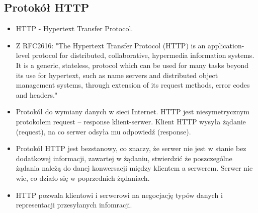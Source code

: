 \documentclass[../main.tex]{subfiles}
\begin{document}
    \subsection{Protokół HTTP}

    \begin{itemize}
        \item HTTP - Hypertext Transfer Protocol.
        \item Z RFC2616: "The Hypertext Transfer Protocol (HTTP) is an application-level protocol for distributed, collaborative, hypermedia information systems. It is a generic, stateless, protocol which can be used for many tasks beyond its use for hypertext, such as name servers and distributed object management systems, through extension of its request methods, error codes and headers."
        \item Protokół do wymiany danych w sieci Internet. HTTP jest niesymetrycznym protokołem request – response klient-serwer. Klient HTTP wysyła żądanie (request), na co serwer odsyła mu odpowiedź (response).
        \item Protokół HTTP jest bezstanowy, co znaczy, że serwer nie jest w stanie bez dodatkowej informacji, zawartej w żądaniu, stwierdzić że poszczególne żądania należą do danej konwersacji między klientem a serwerem. Serwer nie wie, co działo się w poprzednich żądaniach.
        \item HTTP pozwala klientowi i serwerowi na negocjację typów danych i representacji przesyłanych infomracji.
    \end{itemize}
\end{document}
